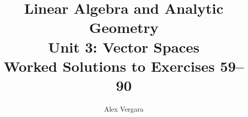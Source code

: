 \documentclass[12pt,twoside,a4paper]{article}
\title{
  \textbf{Linear Algebra and Analytic Geometry}\\[0.35em]
  \large Unit 3: Vector Spaces\\[0.2em]
  \normalsize Worked Solutions to Exercises 59--90
}
\author{Alex Vergara}
\begin{document}
\maketitle

\begin{enumerate}
































\end{enumerate}
\end{document}

